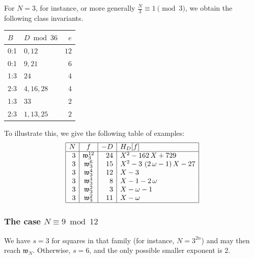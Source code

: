 \documentclass[12pt,twoside,leqno]{article}
\numberwithin{equation}{section}
\newcommand{\w}{\mathfrak w}
\begin{document}
For $N= 3$, for instance, or more generally
$\frac {N}{3} \equiv 1 \pmod 3$, we obtain the following
class invariants.

\begin{center}
\begin{tabular}{|l|l|r|}\hline
$B$ & $D\bmod 36$ &  $e$ \\\hline
0:1 & $0, 12$     & $12$ \\
0:1 & $9, 21$     &  $6$ \\
1:3 & $24$        &  $4$ \\
2:3 & $4, 16, 28$ &  $4$ \\
1:3 & $33$        &  $2$ \\
2:3 & $1, 13, 25$ &  $2$ \\
\hline
\end{tabular}
\end{center}
To illustrate this, we give the following table of examples:
$$\begin{array}{|r|c|r|l|}\hline
N & f & -D & H_{D}[f] \\ \hline
3 & \w_{3}^{12} & 24 &
{X}^{2}-162\,X+729
\\
3 & \w_{3}^{6} & 15 &
{X}^{2}-3\, \left( 2\,\omega-1 \right) X-27
\\
3 & \w_{3}^{4} & 12 &
    X-3
\\
3 & \w_{3}^{4} & 8 &
    X-1-2\,\omega
\\
3 & \w_{3}^{2} & 3 &
    X-\omega-1
\\
3 & \w_{3}^{2} & 11 &
    X-\omega
\\
\hline
\end{array}$$
\subsubsection{The case \texorpdfstring {$N\equiv 9\bmod 12$}{N=9 mod 12}}

We have $s = 3$ for squares in that family (for instance, $N = 3^{2n}$)
and may then reach $\w_N$. Otherwise, $s= 6$, and the only possible
smaller exponent is $2$.
\end{document}
